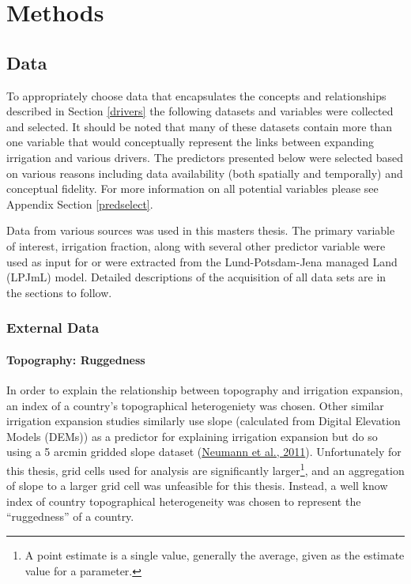\documentclass[12pt,twoside]{reedthesis}
\begin{document}
\hypertarget{methods}{%
\chapter{Methods}\label{methods}}

\hypertarget{data}{%
\section{Data}\label{data}}

To appropriately choose data that encapsulates the concepts and relationships described in Section \ref{drivers} the following datasets and variables were collected and selected. It should be noted that many of these datasets contain more than one variable that would conceptually represent the links between expanding irrigation and various drivers. The predictors presented below were selected based on various reasons including data availability (both spatially and temporally) and conceptual fidelity. For more information on all potential variables please see Appendix Section \ref{predselect}.

Data from various sources was used in this masters thesis. The primary variable of interest, irrigation fraction, along with several other predictor variable were used as input for or were extracted from the Lund-Potsdam-Jena managed Land (LPJmL) model. Detailed descriptions of the acquisition of all data sets are in the sections to follow.

\hypertarget{external-data}{%
\subsection{External Data}\label{external-data}}

\hypertarget{rugged}{%
\subsubsection{Topography: Ruggedness}\label{rugged}}

In order to explain the relationship between topography and irrigation expansion, an index of a country's topographical heterogeniety was chosen. Other similar irrigation expansion studies similarly use slope (calculated from Digital Elevation Models (DEMs)) as a predictor for explaining irrigation expansion but do so using a 5 arcmin gridded slope dataset (\protect\hyperlink{ref-neumannExploringGlobalIrrigation2011}{Neumann et al., 2011}). Unfortunately for this thesis, grid cells used for analysis are significantly larger\footnote{A point estimate is a single value, generally the average, given as the estimate value for a parameter.}, and an aggregation of slope to a larger grid cell was unfeasible for this thesis. Instead, a well know index of country topographical heterogeneity was chosen to represent the ``ruggedness'' of a country.
\end{document}
